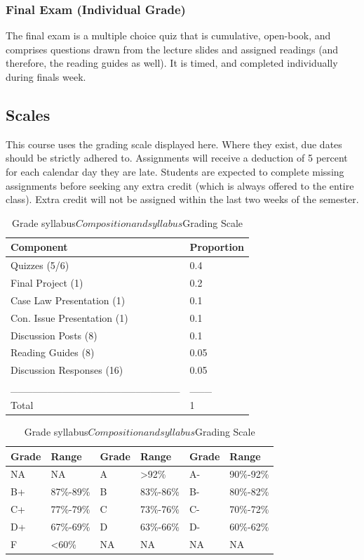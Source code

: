 \documentclass[10pt,]{article}
\begin{document}
\hypertarget{final-exam-individual-grade}{%
\subsubsection{Final Exam (Individual
Grade)}\label{final-exam-individual-grade}}

The final exam is a multiple choice quiz that is cumulative, open-book,
and comprises questions drawn from the lecture slides and assigned
readings (and therefore, the reading guides as well). It is timed, and
completed individually during finals week.

\hypertarget{scales}{%
\subsection{Scales}\label{scales}}

This course uses the grading scale displayed here. Where they exist, due
dates should be strictly adhered to. Assignments will receive a
deduction of 5 percent for each calendar day they are late. Students are
expected to complete missing assignments before seeking any extra credit
(which is always offered to the entire class). Extra credit will not be
assigned within the last two weeks of the semester.

\begin{table}[!h]
\caption{\label{tab:unnamed-chunk-2}Grade syllabus$Composition and syllabus$Grading Scale}

\centering
\begin{tabular}[t]{ll}
\toprule
Component & Proportion\\
\midrule
Quizzes (5/6) & 0.4\\
Final Project (1) & 0.2\\
Case Law Presentation (1) & 0.1\\
Con. Issue Presentation (1) & 0.1\\
Discussion Posts (8) & 0.1\\
\addlinespace
Reading Guides (8) & 0.05\\
Discussion Responses (16) & 0.05\\
\_\_\_\_\_\_\_\_\_\_\_\_\_\_\_\_\_\_\_\_\_\_\_ & \_\_\_\\
Total & 1\\
\bottomrule
\end{tabular}
\centering
\begin{tabular}[t]{llllll}
\toprule
Grade & Range & Grade & Range & Grade & Range\\
\midrule
NA & NA & A & >92\% & A- & 90\%-92\%\\
B+ & 87\%-89\% & B & 83\%-86\% & B- & 80\%-82\%\\
C+ & 77\%-79\% & C & 73\%-76\% & C- & 70\%-72\%\\
D+ & 67\%-69\% & D & 63\%-66\% & D- & 60\%-62\%\\
F & <60\% & NA & NA & NA & NA\\
\bottomrule
\end{tabular}
\end{table}
\end{document}
